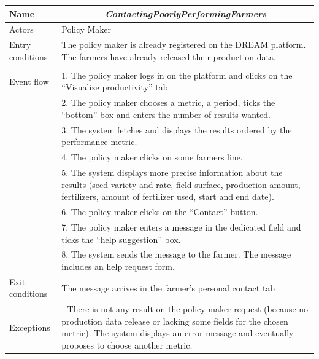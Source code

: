 \begin{table}[htbp]
	\centering
	\begin{tabularx}{\linewidth}{|l|X|}
		\hline
		Name & \multicolumn{1}{c|}{\textit{\textbf{ContactingPoorlyPerformingFarmers}}}                                                   \tabularnewline \hline
		Actors                                               & Policy Maker                                                    \tabularnewline \hline
		Entry conditions                                              &
		The policy maker is already registered on the DREAM platform.
		The farmers have already released their production data.
		\tabularnewline
		&
		\tabularnewline \hline
		Event flow                                         & 1.	The policy maker logs in on the platform and clicks on the “Visualize productivity” tab.                                         \tabularnewline 
		& 2.	The policy maker chooses a metric, a period, ticks the “bottom” box and enters the number of results wanted.                                           \tabularnewline 
		& 3.	The system fetches and displays the results ordered by the performance metric.                                           \tabularnewline 
		& 4.	The policy maker clicks on some farmers line.                                    \tabularnewline
		& 5.	The system displays more precise information about the results (seed variety and rate, field surface, production amount, fertilizers, amount of fertilizer used, start and end date).                                           \tabularnewline
		& 6.	The policy maker clicks on the “Contact” button.                                     \tabularnewline
		& 7.	The policy maker enters a message in the dedicated field and ticks the “help suggestion” box.                                \tabularnewline
		& 8.	The system sends the message to the farmer. The message includes an help request form.                               \tabularnewline \hline
		Exit conditions 
		& The message arrives in the farmer’s personal contact tab
		\tabularnewline \hline
		Exceptions 
		& -	There is not any result on the policy maker request (because no production data release or lacking some fields for the chosen metric). The system displays an error message and eventually proposes to choose another metric.
		\tabularnewline
		\hline
	\end{tabularx}   
\end{table}

